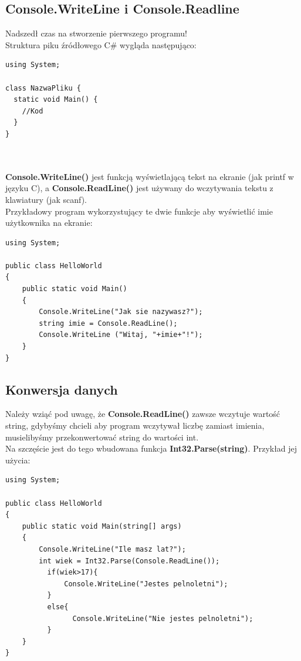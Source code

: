 \documentclass[a4paper]{article}
\theoremstyle{definition}
\begin{document}
\subsection{Console.WriteLine i Console.Readline}
Nadszedł czas na stworzenie pierwszego programu!
\\Struktura piku źródłowego C\# wygląda następująco:
\lstset{language=C}
\begin{lstlisting}[frame=single]
using System;

class NazwaPliku {
  static void Main() {
    //Kod
  }
}
\end{lstlisting}
\\	\\\textbf{Console.WriteLine()} jest funkcją wyświetlającą tekst na ekranie (jak printf w języku C), a \textbf{Console.ReadLine()} jest używany do wczytywania tekstu z klawiatury (jak scanf).
\\Przykładowy program wykorzystujący te dwie funkcje aby wyświetlić imie użytkownika na ekranie:
\lstset{language=C}
\begin{lstlisting}[frame=single]
using System;

public class HelloWorld
{
    public static void Main()
    {
        Console.WriteLine("Jak sie nazywasz?");
        string imie = Console.ReadLine();
        Console.WriteLine ("Witaj, "+imie+"!");
    }
}
\end{lstlisting}
\subsection{Konwersja danych}
Należy wziąć pod uwagę, że \textbf{Console.ReadLine()} zawsze wczytuje wartość string, gdybyśmy chcieli aby program wczytywał liczbę zamiast imienia, musielibyśmy przekonwertować string do wartości int.\\
Na szczęście jest do tego wbudowana funkcja \textbf{Int32.Parse(string)}. Przykład jej użycia:\\
\begin{lstlisting}[frame=single]
using System;

public class HelloWorld
{
    public static void Main(string[] args)
    {
        Console.WriteLine("Ile masz lat?");
        int wiek = Int32.Parse(Console.ReadLine());
	      if(wiek>17){
        	  Console.WriteLine("Jestes pelnoletni");
	      }
	      else{
		        Console.WriteLine("Nie jestes pelnoletni");
	      }
    }
}
\end{lstlisting}
\end{document}
